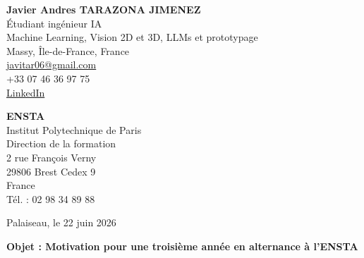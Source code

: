 \documentclass[10pt,a4paper]{article}
\begin{document}
\begin{minipage}[t]{0.50\textwidth}
\textbf{\large Javier Andres TARAZONA JIMENEZ}\\
Étudiant ingénieur IA \\
Machine Learning, Vision 2D et 3D, LLMs et prototypage \\
Massy, Île-de-France, France\\
\href{mailto:javitar06@gmail.com}{javitar06@gmail.com}\\
+33 07 46 36 97 75\\
\href{https://www.linkedin.com/in/javier-andres-tarazona-jimenez-84b489222/}{LinkedIn}
\end{minipage}
\hfill
\begin{minipage}[t]{0.44\textwidth}
\raggedleft
\textbf{ENSTA}\\
Institut Polytechnique de Paris\\
Direction de la formation\\
\vspace{0.35em}
2 rue François Verny\\
29806 Brest Cedex 9\\
France\\
\vspace{0.35em}
Tél. : 02 98 34 89 88
\end{minipage}

\vspace{1.1cm}

\raggedleft
Palaiseau, le 22 juin 2026

\vspace{0.7cm}

\raggedright
\textbf{Objet : Motivation pour une troisième année en alternance à l'ENSTA}

\vspace{0.5cm}
\end{document}
